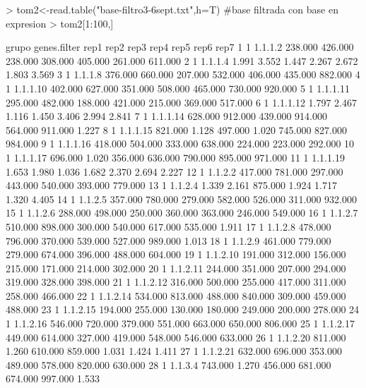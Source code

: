 \documentclass[12pt]{article}
\begin{document}
\begin{Schunk}
\begin{Sinput}
> tom2<-read.table("base-filtro3-6sept.txt",h=T) #base filtrada con base en expresion
> tom2[1:100,]
\end{Sinput}
\begin{Soutput}
    grupo genes.filter    rep1    rep2    rep3    rep4    rep5    rep6    rep7
1       1      1.1.1.2 238.000 426.000 238.000 308.000 405.000 261.000 611.000
2       1      1.1.1.4   1.991   3.552   1.447   2.267   2.672   1.803   3.569
3       1      1.1.1.8 376.000 660.000 207.000 532.000 406.000 435.000 882.000
4       1     1.1.1.10 402.000 627.000 351.000 508.000 465.000 730.000 920.000
5       1     1.1.1.11 295.000 482.000 188.000 421.000 215.000 369.000 517.000
6       1     1.1.1.12   1.797   2.467   1.116   1.450   3.406   2.994   2.841
7       1     1.1.1.14 628.000 912.000 439.000 914.000 564.000 911.000   1.227
8       1     1.1.1.15 821.000   1.128 497.000   1.020 745.000 827.000 984.000
9       1     1.1.1.16 418.000 504.000 333.000 638.000 224.000 223.000 292.000
10      1     1.1.1.17 696.000   1.020 356.000 636.000 790.000 895.000 971.000
11      1     1.1.1.19   1.653   1.980   1.036   1.682   2.370   2.694   2.227
12      1      1.1.2.2 417.000 781.000 297.000 443.000 540.000 393.000 779.000
13      1      1.1.2.4   1.339   2.161 875.000   1.924   1.717   1.320   4.405
14      1      1.1.2.5 357.000 780.000 279.000 582.000 526.000 311.000 932.000
15      1      1.1.2.6 288.000 498.000 250.000 360.000 363.000 246.000 549.000
16      1      1.1.2.7 510.000 898.000 300.000 540.000 617.000 535.000   1.911
17      1      1.1.2.8 478.000 796.000 370.000 539.000 527.000 989.000   1.013
18      1      1.1.2.9 461.000 779.000 279.000 674.000 396.000 488.000 604.000
19      1     1.1.2.10 191.000 312.000 156.000 215.000 171.000 214.000 302.000
20      1     1.1.2.11 244.000 351.000 207.000 294.000 319.000 328.000 398.000
21      1     1.1.2.12 316.000 500.000 255.000 417.000 311.000 258.000 466.000
22      1     1.1.2.14 534.000 813.000 488.000 840.000 309.000 459.000 488.000
23      1     1.1.2.15 194.000 255.000 130.000 180.000 249.000 200.000 278.000
24      1     1.1.2.16 546.000 720.000 379.000 551.000 663.000 650.000 806.000
25      1     1.1.2.17 449.000 614.000 327.000 419.000 548.000 546.000 633.000
26      1     1.1.2.20 811.000   1.260 610.000 859.000   1.031   1.424   1.411
27      1     1.1.2.21 632.000 696.000 353.000 489.000 578.000 820.000 630.000
28      1      1.1.3.4 743.000   1.270 456.000 681.000 674.000 997.000   1.533

\end{Soutput}
\end{Schunk}
\end{document}
